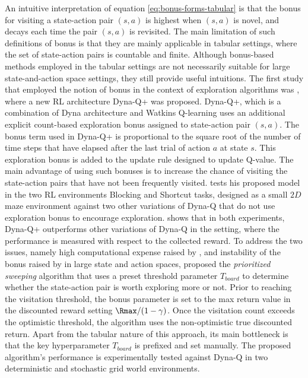 An intuitive interpretation of equation \eqref{eq:bonus-forms-tabular} is that the bonus for visiting a state-action pair $(s,a)$ is highest when $(s,a)$ is novel, and decays each time the pair $(s,a)$ is revisited. The main limitation of such definitions of bonus is that they are mainly applicable in tabular settings, where the set of state-action pairs is countable and finite. Although bonus-based methods employed in the tabular settings are not necessarily suitable for large state-and-action space settings, they still provide useful intuitions. The first study that employed the notion of bonus in the context of exploration algorithms was , where a new RL architecture Dyna-Q+ was proposed. Dyna-Q+, which is a combination of Dyna architecture  and Watkins Q-learning  uses an additional explicit count-based exploration bonus assigned to state-action pair $(s,a)$. The bonus term used in Dyna-Q+ is proportional to the square root of the number of time steps that have elapsed after the last trial of action $a$ at state $s$. This exploration bonus is added to the update rule designed to update Q-value. The main advantage of using such bonuses is to increase the chance of visiting the state-action pairs that have not been frequently visited.  tests his proposed model in the two RL environments Blocking and Shortcut tasks, designed as a small $2D$ maze environment against two other variations of Dyna-Q that do not use exploration bonus to encourage exploration.  shows that in both experiments, Dyna-Q+ outperforms other variations of Dyna-Q in the setting, where the performance is measured with respect to the collected reward. To address the two issues, namely high computational expense raised by , and instability of the bonus raised by  in large state and action spaces,  proposed the \textit{prioritized sweeping} algorithm that uses a preset threshold parameter $T_{board}$ to determine whether the state-action pair is worth exploring more or not. Prior to reaching the visitation threshold, the bonus parameter is set to the max return value in the discounted reward setting $\Rmax/(1-\gamma)$. Once the visitation count exceeds the optimistic threshold, the algorithm uses the non-optimistic true discounted return. Apart from the tabular nature of this approach, its main bottleneck is that the key hyperparameter $T_{board}$ is prefixed and set manually. The proposed algorithm's performance is experimentally tested against Dyna-Q in two deterministic and stochastic grid world environments.
